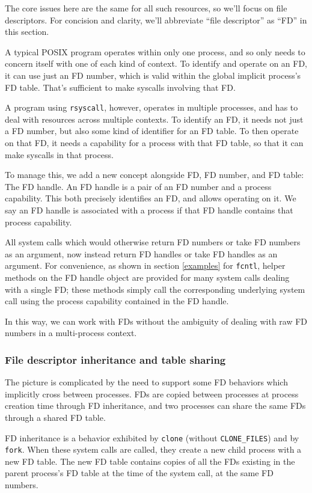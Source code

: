 \documentclass[letterpaper,twocolumn,10pt]{article}
\begin{document}
The core issues here are the same for all such resources,
so we'll focus on file descriptors.
For concision and clarity, we'll abbreviate ``file descriptor'' as ``FD'' in this section.

A typical POSIX program operates within only one process,
and so only needs to concern itself with one of each kind of context.
To identify and operate on an FD, it can use just an FD number,
which is valid within the global implicit process's FD table.
That's sufficient to make syscalls involving that FD.

A program using \texttt{rsyscall}, however,
operates in multiple processes,
and has to deal with resources across multiple contexts.
To identify an FD,
it needs not just a FD number,
but also some kind of identifier for an FD table.
To then operate on that FD,
it needs a capability for a process with that FD table,
so that it can make syscalls in that process.

To manage this, we add a new concept alongside FD, FD number, and FD table:
The FD handle.
An FD handle is a pair of an FD number and a process capability.
This both precisely identifies an FD, and allows operating on it.
We say an FD handle is associated with a process
if that FD handle contains that process capability.

All system calls which would otherwise return FD numbers or take FD numbers as an argument,
now instead return FD handles or take FD handles as an argument.
For convenience, as shown in section \ref{examples} for \texttt{fcntl},
helper methods on the FD handle object are provided for many system calls dealing with a single FD;
these methods simply call the corresponding underlying system call
using the process capability contained in the FD handle.

In this way, we can work with FDs without the ambiguity of dealing with raw FD numbers in a multi-process context.
\subsubsection{File descriptor inheritance and table sharing}\label{inheritance}
The picture is complicated by the need to support some FD behaviors which implicitly cross between processes.
FDs are copied between processes at process creation time through FD inheritance,
and two processes can share the same FDs through a shared FD table.

FD inheritance is a behavior exhibited by \texttt{clone} (without \verb|CLONE_FILES|) and by \texttt{fork}.
When these system calls are called,
they create a new child process with a new FD table.
The new FD table contains copies of all the FDs existing in the parent process's FD table at the time of the system call,
at the same FD numbers.
\end{document}
